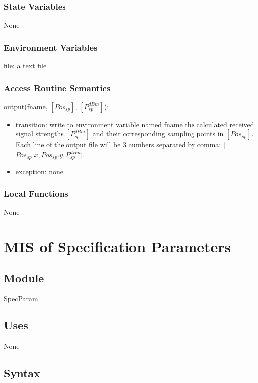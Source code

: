 \documentclass[12pt, titlepage]{article}
\begin{document}
\subsubsection{State Variables} None

\subsubsection{Environment Variables} file: a text file

\subsubsection{Access Routine Semantics}

\noindent output(fname, $[Pos_{sp}]$, $[P_{sp}^{dBm}]$):
\begin{itemize}
\item transition: write to environment variable named fname the calculated received signal strengths $[P_{sp}^{dBm}]$ and their corresponding sampling points in $[Pos_{sp}]$.\\
Each line of the output file will be 3 numbers separated by comma: [$Pos_{sp}.x, Pos_{sp}.y, P_{sp}^{dBm}$].

\item exception: none
\end{itemize}

\subsubsection{Local Functions}
None



\newpage
\section{MIS of Specification Parameters} \label{specParamModule}

\subsection{Module}

SpecParam

\subsection{Uses} None

\subsection{Syntax}
\end{document}
